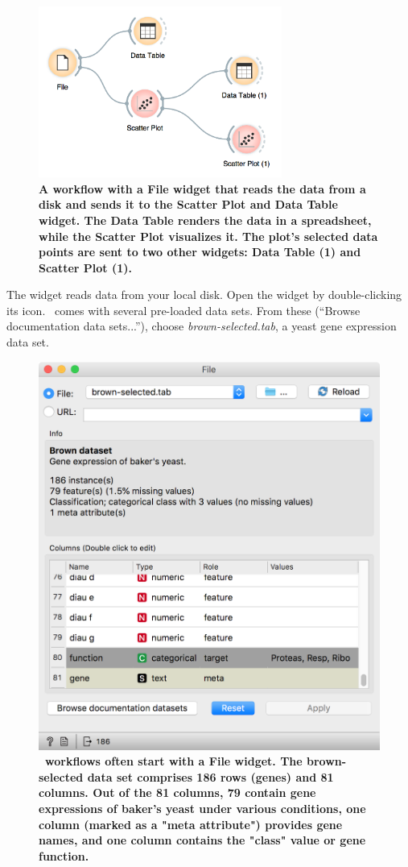 \begin{figure}[h]
  \centering
  \includegraphics[width=80mm]{workflow-fig2.png}%
  \caption{\textbf{\textsf{A workflow with a File widget that reads the data from a disk and sends it to the Scatter Plot and Data Table widget. The Data Table renders the data in a spreadsheet, while the Scatter Plot visualizes it. The plot's selected data points are sent to two other widgets: Data Table (1) and Scatter Plot (1).}}}
  \label{fig:workflow-fig2}
\end{figure}

The  widget reads data from your local disk. Open the  widget by double-clicking its icon. \mutation\ comes with several pre-loaded data sets. From these (``Browse documentation data sets...''), choose \textit{brown-selected.tab}, a yeast gene expression data set.

\begin{figure}[h]
  \centering
  \includegraphics[width=0.9\linewidth]{file-brown.png}%
  \caption{\textbf{\textsf{\mutation\ workflows often start with a File widget. The brown-selected data set comprises 186 rows (genes) and 81 columns. Out of the 81 columns, 79 contain gene expressions of baker's yeast under various conditions, one column (marked as a "meta attribute") provides gene names, and one column contains the "class" value or gene function.}}}
  \label{fig:workflow-fig3}
\end{figure}


